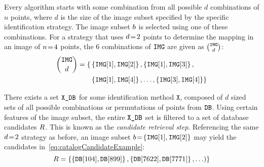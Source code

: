 Every algorithm starts with some combination from all possible $d$ combinations of $n$ points, where $d$ is the size of the image subset specified by the specific identification strategy.
The image subset $b$ is selected using one of these combinations.
For a strategy that uses $d\!=\!2$ points to determine the mapping in an image of $n\!=\! 4$ points, the 6 combinations of $\texttt{IMG}$ are given as $\binom{\texttt{IMG}}{d}$:
\begin{equation}
    \begin{aligned}
	    \binom{\texttt{IMG}}{d} = \{&
	    	\left\{ \texttt{IMG}[1], \texttt{IMG}[2] \right\},
	    	\left\{ \texttt{IMG}[1], \texttt{IMG}[3] \right\}, \\
	       &\left\{ \texttt{IMG}[1], \texttt{IMG}[4] \right\}, \ldots,
	        \left\{ \texttt{IMG}[3], \texttt{IMG}[4] \right\}
	        \}
    \end{aligned}
\end{equation}

There exists a set $\texttt{X\_DB}$ for some identification method $\texttt{X}$, composed of $d$ sized sets of all possible combinations or permutations of points from $\texttt{DB}$.
Using certain features of the image subset, the entire $\texttt{X\_DB}$ set is filtered to a set of database candidates $R$.
This is known as the \emph{candidate retrieval step}.
Referencing the same $d\!=\! 2$ strategy as before, an image subset $b \!=\! \left\{ \texttt{IMG}[1], \texttt{IMG}[2] \right\}$ may yield the candidates in~\autoref{eq:catalogCandidateExample}:
\begin{equation}
	\label{eq:catalogCandidateExample}
    \databasesubset = \set{ \set{\vv{\databaseset[104]}, \vv{\databaseset[899]}}, \set{\vv{\databaseset[7622]}, \vv{\databaseset[7771]}}, \ldots) } 
\end{equation}

